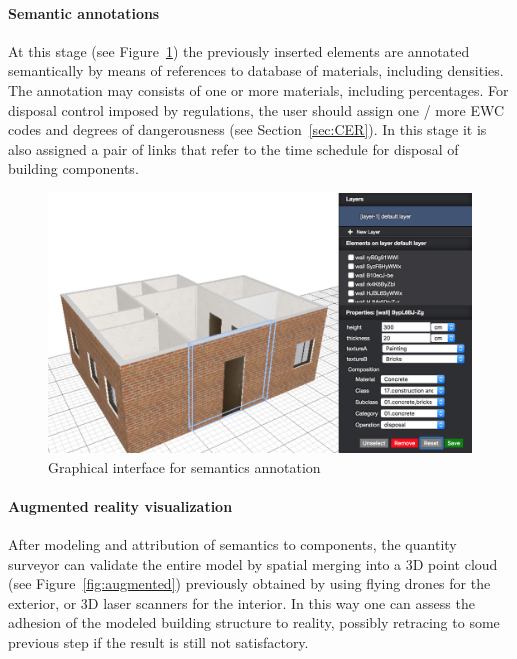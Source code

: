 \documentclass[a4paper,twoside]{article}
\begin{document}
\paragraph{Semantic annotations} 

\noindent
At this stage (see Figure~\ref{fig:semantics}) the previously inserted elements are annotated semantically  by means of references to database of materials, including densities. The annotation may consists of one or more materials, including percentages.
For disposal control imposed by regulations, the user should assign one / more EWC codes and degrees of dangerousness (see Section~\ref{sec:CER}).
In this stage it is also assigned a pair of links that refer to the time schedule for disposal of  building components.

\begin{figure}[!h]
  \centering
  \includegraphics[width=1\linewidth]{images/3d-sel.png}
  \caption{Graphical interface for semantics annotation}
  \label{fig:semantics}
\end{figure}

\paragraph{Augmented reality visualization} 

\noindent
After modeling and attribution of semantics to components, the quantity surveyor can validate the entire model by spatial merging into a 3D point cloud (see Figure~\ref{fig:augmented}) previously obtained by using flying drones for the exterior, or 3D laser scanners for the interior. In this way one can assess the adhesion of the modeled building structure to reality, possibly retracing to some previous step if the result is still not satisfactory.
\end{document}
